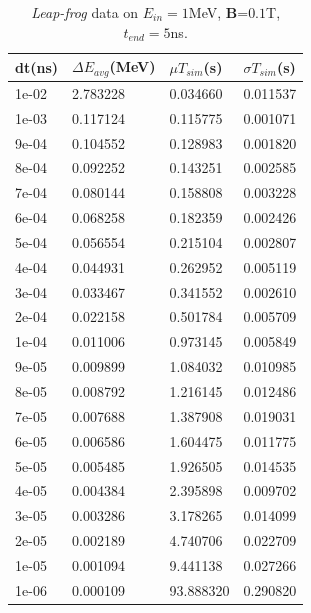 \documentclass[a4paper,oneside,12pt]{report}
\numberwithin{equation}{chapter}
\begin{document}
\begin{table}[H]
    \centering
    \caption{\textit{Leap-frog} data on $E_{in}=1$MeV, \textbf{B}=$0.1$T, $t_{end}=5$ns.}
    \vspace{10pt}
    \begin{tabular}{|l|l|l|l|}
    \hline
    dt(ns)       & $\Delta E_{avg}$(MeV) & $\mu T_{sim}$(s)    & $\sigma T_{sim}$(s) \\\hline
        1e-02 & 2.783228     & 0.034660  & 0.011537 \\ \hline
        1e-03 & 0.117124     & 0.115775  & 0.001071 \\ \hline
        9e-04 & 0.104552     & 0.128983  & 0.001820 \\  \hline
        8e-04 & 0.092252     & 0.143251  & 0.002585 \\ \hline
        7e-04 & 0.080144     & 0.158808  & 0.003228 \\ \hline
        6e-04 & 0.068258     & 0.182359  & 0.002426 \\\hline
        5e-04 & 0.056554     & 0.215104  & 0.002807 \\\hline
        4e-04 & 0.044931     & 0.262952  & 0.005119 \\\hline
        3e-04 & 0.033467     & 0.341552  & 0.002610 \\\hline
        2e-04 & 0.022158     & 0.501784  & 0.005709 \\\hline
        1e-04 & 0.011006     & 0.973145  & 0.005849 \\\hline
        9e-05 & 0.009899     & 1.084032  & 0.010985 \\\hline
        8e-05 & 0.008792     & 1.216145  & 0.012486 \\\hline
        7e-05 & 0.007688     & 1.387908  & 0.019031 \\\hline
        6e-05 & 0.006586     & 1.604475  & 0.011775 \\\hline
        5e-05 & 0.005485     & 1.926505  & 0.014535 \\\hline
        4e-05 & 0.004384     & 2.395898  & 0.009702 \\\hline
        3e-05 & 0.003286     & 3.178265  & 0.014099 \\\hline
        2e-05 & 0.002189     & 4.740706  & 0.022709 \\\hline
        1e-05 & 0.001094     & 9.441138  & 0.027266 \\\hline
        1e-06 & 0.000109     & 93.888320 & 0.290820 \\ \hline
    \end{tabular}
    \label{tab:lf_mag_table}
\end{table}
\end{document}
